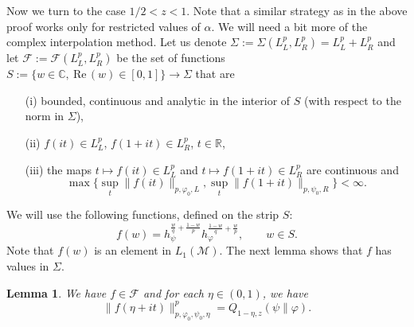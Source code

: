 \documentclass[12pt]{article}
\newtheorem{lemma}{Lemma}
\theoremstyle{definition}
\theoremstyle{remark}
\newtheorem{remark}{Remark}
\def\Me{\mathcal M}
\def\Fe{\mathcal F}
\begin{document}
Now we turn to the case $1/2<z<1$. Note that a similar strategy as in the above proof
works only for  restricted values of $\alpha$. We will need a bit more of the complex
interpolation method. Let us denote 
$\Sigma:=\Sigma(L^p_L,L^p_R)=L_L^p+L^p_R$ and let
$\Fe:=\Fe(L^p_L,L^p_R)$ be the set of functions $S:=\{w\in \mathbb C,\ \mathrm{Re}\,(w)\in
[0,1]\}\to \Sigma$ that are 
\begin{enumerate}
\item[(i)] bounded, continuous and analytic in the interior of $S$ (with respect
to the norm in $\Sigma$),
\item[(ii)] $f(it)\in L^p_L$, $f(1+it)\in L^p_R$, $t\in \mathbb R$,
\item[(iii)] the maps $t\mapsto f(it)\in L^p_L$ and $t\mapsto f(1+it)\in L^p_R$ are
continuous and 
\[
\max\{\sup_{t}\|f(it)\|_{p,\varphi_0,L},\sup_{t}\|f(1+it)\|_{p,\psi_0,R}\}<\infty.
\]
\end{enumerate}

%
%
%
We will use the following functions, defined on the strip $S$:
\begin{equation}\label{eq:f}
f(w)= h_\psi^{\frac wq+\frac{1-w}p}h_\varphi^{\frac{1-w}q+\frac wp},\qquad w\in S.
\end{equation}
Note that $f(w)$ is an element in $L_1(\Me)$. The next lemma shows that $f$ has values in
$\Sigma$.

\begin{lemma}\label{lemma:fw}  We have $f\in \Fe$ and  
for each $\eta\in (0,1)$, we have
\[
\|f(\eta+it)\|_{p,\varphi_0,\psi_0,\eta}^p=Q_{1-\eta,z}(\psi\|\varphi).
\]



\end{lemma}
\end{document}
